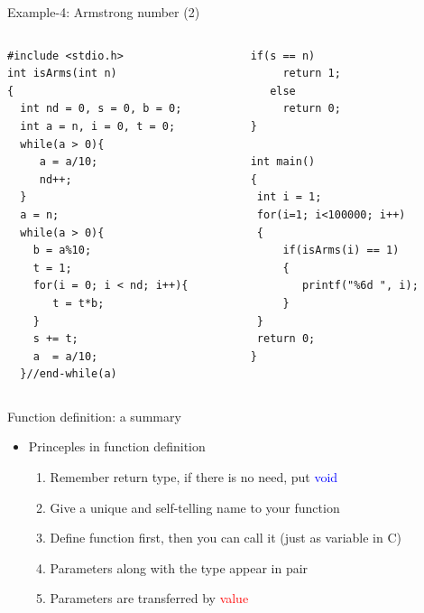 \begin{frame}[fragile]{Example-4: Armstrong number (2)}
\vspace{-0.16in}
\begin{columns}
\begin{column}{0.48\linewidth}
\begin{lstlisting}[linewidth=0.95\linewidth]
#include <stdio.h>
int isArms(int n)
{
  int nd = 0, s = 0, b = 0;
  int a = n, i = 0, t = 0;
  while(a > 0){
     a = a/10;
     nd++;
  }
  a = n;
  while(a > 0){
    b = a%10;
    t = 1;
    for(i = 0; i < nd; i++){
       t = t*b;
    }
    s += t;
    a  = a/10;
  }//end-while(a)
\end{lstlisting}
\end{column}
\begin{column}{0.48\linewidth}
\begin{lstlisting}[firstnumber=20, linewidth=0.95\linewidth]
   if(s == n)
     return 1;
   else
     return 0;
}

int main()
{
 int i = 1;
 for(i=1; i<100000; i++)
 {
     if(isArms(i) == 1)
     {
        printf("%6d ", i);
     }
 }
 return 0;
}
\end{lstlisting}
\end{column}
\end{columns}
\end{frame}


\begin{frame}[fragile]{Function definition: a summary}
\LARGE{
\begin{itemize}
	\item {Princeples in function definition}
	\begin{enumerate}
		\item {Remember return type, if there is no need, put \textcolor{blue}{void}}
		\item {Give a unique and self-telling name to your function}
		\item {Define function first, then you can call it (just as variable in C)}
		\item {Parameters along with the type appear in pair}
		\item {Parameters are transferred by \textcolor{red}{value}}
	\end{enumerate}
\end{itemize}
}
\end{frame}


